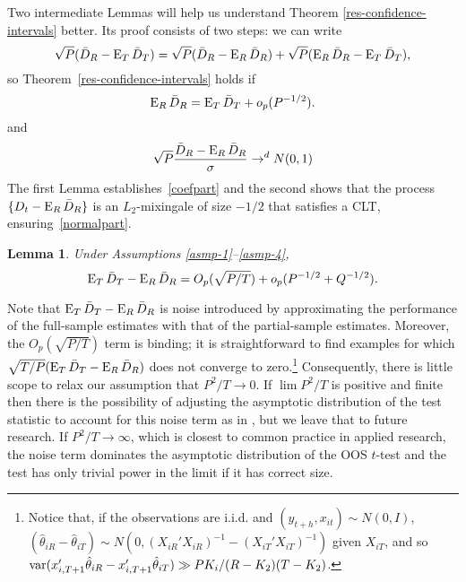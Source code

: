 \documentclass[11pt]{article}
\newtheorem{lem}{Lemma}
\begin{document}
Two intermediate Lemmas will help us understand Theorem
\ref{res-confidence-intervals} better.  Its proof consists of two
steps: we can write
\begin{equation}
  \sqrt{P} (\bar{D}_{R} - \operatorname{E}_T \bar{D}_{T}) = \sqrt{P} (\bar{D}_{R} - \operatorname{E}_R
  \bar{D}_{R}) + \sqrt{P} (\operatorname{E}_R \bar{D}_{R} - \operatorname{E}_T \bar{D}_{T}),
\end{equation}
so Theorem~\ref{res-confidence-intervals} holds if
\begin{equation}\label{coefpart}
  \operatorname{E}_R \bar{D}_{R} = \operatorname{E}_T \bar{D}_{T} + o_p(P^{-1/2}).
\end{equation}
and
\begin{equation}\label{normalpart}
  \sqrt{P}\frac{\bar{D}_{R} - \operatorname{E}_R \bar{D}_{R}}{\sigma} \to^d N(0,1)
\end{equation}
The first Lemma establishes~\eqref{coefpart} and the second shows that
the process $\{D_t - \operatorname{E}_R \bar{D}_{R}\}$ is an $L_2$-mixingale of size
$-1/2$ that satisfies a CLT, ensuring~\eqref{normalpart}.

\begin{lem} \label{res-convergence}
  Under Assumptions \ref{asmp-1}--\ref{asmp-4},
  \begin{equation}\label{eq:7}
    \operatorname{E}_T \bar{D}_{T} - \operatorname{E}_R \bar{D}_{R} = O_p(\sqrt{P/T}) + o_p(P^{-1/2} + Q^{-1/2}).
  \end{equation}
\end{lem}

Note that $\operatorname{E}_T \bar{D}_{T} - \operatorname{E}_R \bar{D}_{R}$ is noise introduced by
approximating the performance of the full-sample estimates with that
of the partial-sample estimates.  Moreover, the $O_p(\sqrt{P/T})$ term
is binding; it is straightforward to find examples for which
$\sqrt{T/P}(\operatorname{E}_T \bar{D}_{T} - \operatorname{E}_R \bar{D}_{R})$ does not converge to
zero.\footnote{Notice that, if the observations are i.i.d. and
  $(y_{t+h}, x_{it}) \sim N(0,I)$, $(\hat{\theta}_{iR} -
  \hat{\theta}_{iT}) \sim N(0, (X_{iR}'X_{iR})^{-1} -
  (X_{iT}'X_{iT})^{-1})$ given $X_{iT}$, and so
  $\operatorname{var}(x_{i,T+1}'\hat{\theta}_{iR} - x_{i,T+1}'
  \hat{\theta}_{iT}) \gg P K_i / (R - K_2)(T - K_2)$.}
Consequently, there is little scope to relax our assumption that
$P^2/T \to 0$.  If $\lim P^2/T$ is positive and finite then there is
the possibility of adjusting the asymptotic distribution of the test
statistic to account for this noise term as in \citet{Wes:96}, but we
leave that to future research.  If $P^2/T \to \infty$, which is
closest to common practice in applied research, the noise term
dominates the asymptotic distribution of the OOS $t$-test and the
test has only trivial power in the limit if it has correct size.
\end{document}
